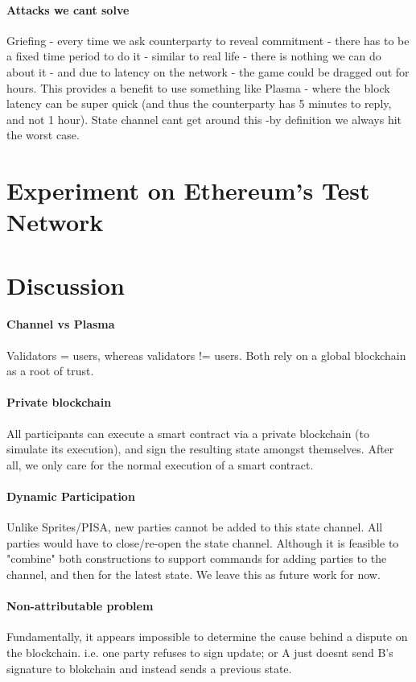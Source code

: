 \documentclass{article}
\begin{document}
\paragraph{Attacks we cant solve} Griefing - every time we ask counterparty to reveal commitment - there has to be a fixed time period to do it - similar to real life - there is nothing we can do about it - and due to latency on the network - the game could be dragged out for hours. This provides a benefit to use something like Plasma - where the block latency can be super quick (and thus the counterparty has 5 minutes to reply, and not 1 hour). State channel cant get around this -by definition we always hit the worst case. 

\section{Experiment on Ethereum's Test Network}

\section{Discussion} 

\paragraph{Channel vs Plasma} Validators = users, whereas validators != users. Both rely on a global blockchain as a root of trust. 

\paragraph{Private blockchain} All participants can execute a smart contract via a private blockchain (to simulate its execution), and sign the resulting state amongst themselves. After all, we only care for the normal execution of a smart contract. 

\paragraph{Dynamic Participation} Unlike Sprites/PISA, new parties cannot be added to this state channel. All parties would have to close/re-open the state channel. Although it is feasible to "combine" both constructions to support commands for adding parties to the channel, and then for the latest state. We leave this as future work for now. 


\paragraph{Non-attributable problem} Fundamentally, it appears impossible to determine the cause behind a dispute on the blockchain. i.e. one party refuses to sign update; or A just doesnt send B's signature to blokchain and instead sends a previous state.
\end{document}
